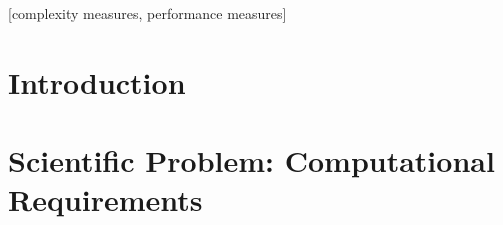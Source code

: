 \documentclass{sig-alternate}
\begin{document}

\title{}

\author{
\alignauthor
A \\
       \\
       \\
\and  %
\alignauthor 
B \\
       \\
       \\
\alignauthor 
C \\
       \\
       \\
}

\maketitle

\begin{abstract}

A description of the computational workflow, viz., the different
machines/resources used, how many ensembles we simulated, data
volumnes managed etc., (ii) any computational performance issues
including (a) measuring "efficiency" as the number of distributed
resources utilized goes as measured by $T_c$ (time to completion), (b)
$T_c$ as a function of the number of replicas, and (iii) a description
of the software infrastructure that is employed to enable distributed
replica-exchange on XSEDE. 

\end{abstract}

[complexity measures, performance measures]



\section{Introduction}

\section{Scientific Problem:  Computational Requirements}
\label{sec:requirements}
\end{document}
